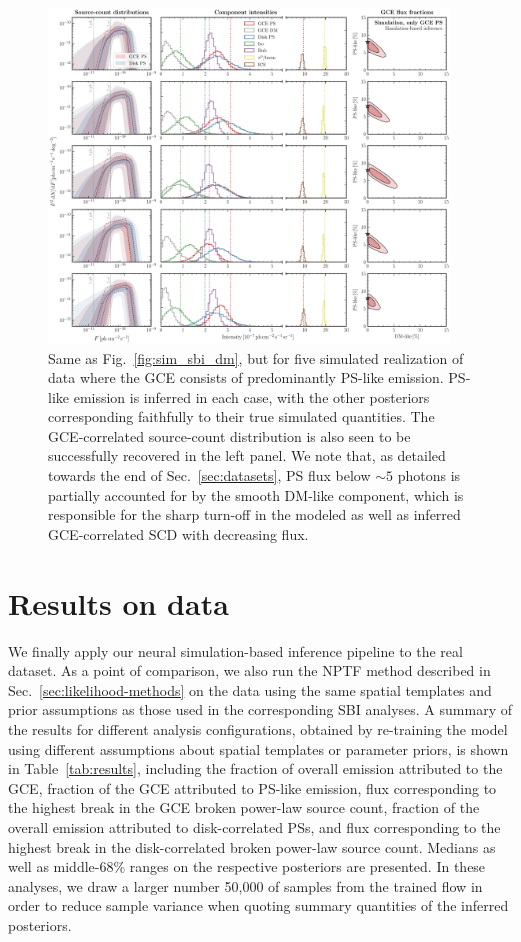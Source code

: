 \documentclass[prd,aps,10pt,nofootinbib,twocolumn,superscriptaddress,preprintnumbers,balancelastpage,longbibliography,floatfix]{revtex4-2}
\begin{document}
%
\begin{figure}[!htbp]
\centering
\includegraphics[width=0.95\textwidth]{sim_sbi_ps.pdf}
\caption{Same as Fig.~\ref{fig:sim_sbi_dm}, but for five simulated realization of \Fermi data where the GCE consists of predominantly PS-like emission. PS-like emission is inferred in each case, with the other posteriors corresponding faithfully to their true simulated quantities. The GCE-correlated source-count distribution is also seen to be successfully recovered in the left panel. We note that, as detailed towards the end of Sec.~\ref{sec:datasets}, PS flux below $\sim 5$ photons is partially accounted for by the smooth DM-like component, which is responsible for the sharp turn-off in the modeled as well as inferred GCE-correlated SCD with decreasing flux.}
\label{fig:sim_sbi_ps}
\end{figure}
%

\section{Results on \Fermi data}
\label{sec:data}

We finally apply our neural simulation-based inference pipeline to the real \Fermi dataset. As a point of comparison, we also run the NPTF method described in Sec.~\ref{sec:likelihood-methods} on the data using the same spatial templates and prior assumptions as those used in the corresponding SBI analyses. A summary of the results for different analysis configurations, obtained by re-training the model using different assumptions about spatial templates or parameter priors, is shown in Table~\ref{tab:results}, including the fraction of overall emission attributed to the GCE, fraction of the GCE attributed to PS-like emission, flux corresponding to the highest break in the GCE broken power-law source count, fraction of the overall emission attributed to disk-correlated PSs, and flux corresponding to the highest break in the disk-correlated broken power-law source count. Medians as well as middle-68\% ranges on the respective posteriors are presented. In these analyses, we draw a larger number 50,000 of samples from the trained flow in order to reduce sample variance when quoting summary quantities of the inferred posteriors.
\end{document}
